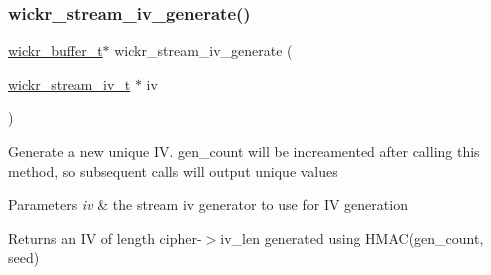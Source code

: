 \subsubsection{\texorpdfstring{wickr\+\_\+stream\+\_\+iv\+\_\+generate()}{wickr\_stream\_iv\_generate()}}
{\footnotesize\ttfamily \hyperlink{structwickr__buffer}{wickr\+\_\+buffer\+\_\+t}$\ast$ wickr\+\_\+stream\+\_\+iv\+\_\+generate (\begin{DoxyParamCaption}\item[{\hyperlink{structwickr__stream__iv}{wickr\+\_\+stream\+\_\+iv\+\_\+t} $\ast$}]{iv }\end{DoxyParamCaption})}

Generate a new unique IV. gen\+\_\+count will be increamented after calling this method, so subsequent calls will output unique values


\begin{DoxyParams}{Parameters}
{\em iv} & the stream iv generator to use for IV generation \\
\hline
\end{DoxyParams}
\begin{DoxyReturn}{Returns}
an IV of length \textquotesingle{}cipher\textquotesingle{}-\/$>$iv\+\_\+len generated using H\+M\+A\+C(gen\+\_\+count, seed) 
\end{DoxyReturn}
